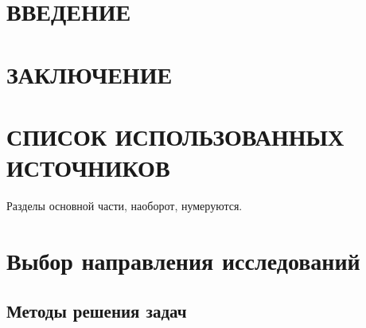 \section*{ВВЕДЕНИЕ}

\section*{ЗАКЛЮЧЕНИЕ}

\section*{СПИСОК ИСПОЛЬЗОВАННЫХ ИСТОЧНИКОВ}

Разделы основной части, наоборот, нумеруются.

\section{Выбор направления исследований}

\subsection{Методы решения задач}
